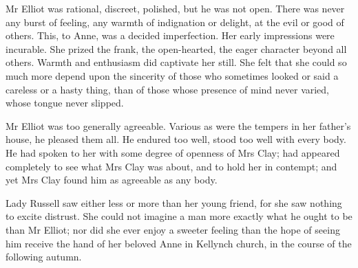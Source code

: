 Mr Elliot was rational, discreet, polished, but he was not open. There was never any burst of feeling, any warmth of indignation or delight, at the evil or good of others. This, to Anne, was a decided imperfection. Her early impressions were incurable. She prized the frank, the open-hearted, the eager character beyond all others. Warmth and enthusiasm did captivate her still. She felt that she could so much more depend upon the sincerity of those who sometimes looked or said a careless or a hasty thing, than of those whose presence of mind never varied, whose tongue never slipped.

Mr Elliot was too generally agreeable. Various as were the tempers in her father's house, he pleased them all. He endured too well, stood too well with every body. He had spoken to her with some degree of openness of Mrs Clay; had appeared completely to see what Mrs Clay was about, and to hold her in contempt; and yet Mrs Clay found him as agreeable as any body.

Lady Russell saw either less or more than her young friend, for she saw nothing to excite distrust. She could not imagine a man more exactly what he ought to be than Mr Elliot; nor did she ever enjoy a sweeter feeling than the hope of seeing him receive the hand of her beloved Anne in Kellynch church, in the course of the following autumn.